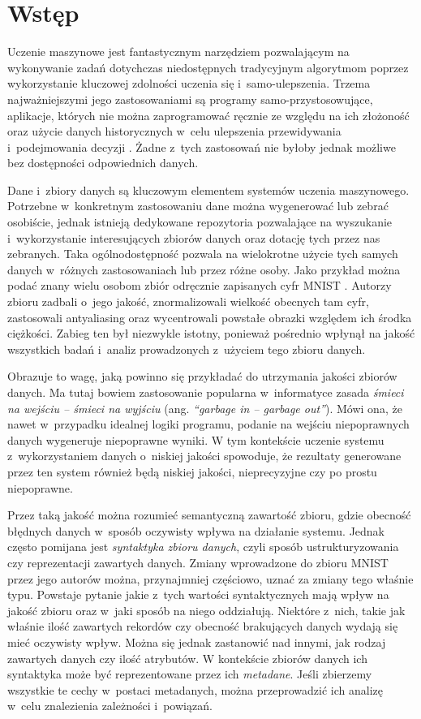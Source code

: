 \chapter*{Wstęp}
\label{ch:introduction}

Uczenie maszynowe jest fantastycznym narzędziem pozwalającym na wykonywanie zadań dotychczas niedostępnych tradycyjnym algorytmom poprzez wykorzystanie kluczowej zdolności uczenia się i~samo-ulepszenia.
Trzema najważniejszymi jego zastosowaniami są programy samo-przystosowujące, aplikacje, których nie można zaprogramować ręcznie ze względu na ich złożoność oraz użycie danych historycznych w~celu ulepszenia przewidywania i~podejmowania decyzji \cite{mitchell1997machine}.
Żadne z~tych zastosowań nie byłoby jednak możliwe bez dostępności odpowiednich danych.

Dane i~zbiory danych są kluczowym elementem systemów uczenia maszynowego.
Potrzebne w~konkretnym zastosowaniu dane można wygenerować lub zebrać osobiście, jednak istnieją dedykowane repozytoria pozwalające na wyszukanie i~wykorzystanie interesujących zbiorów danych oraz dotację tych przez nas zebranych.
Taka ogólnodostępność pozwala na wielokrotne użycie tych samych danych w~różnych zastosowaniach lub przez różne osoby.
Jako przykład można podać znany wielu osobom zbiór odręcznie zapisanych cyfr MNIST \cite{mnist}.
Autorzy zbioru zadbali o~jego jakość, znormalizowali wielkość obecnych tam cyfr, zastosowali antyaliasing oraz wycentrowali powstałe obrazki względem ich środka ciężkości.
Zabieg ten był niezwykle istotny, ponieważ pośrednio wpłynął na jakość wszystkich badań i~analiz prowadzonych z~użyciem tego zbioru danych.

Obrazuje to wagę, jaką powinno się przykładać do utrzymania jakości zbiorów danych.
Ma tutaj bowiem zastosowanie popularna w~informatyce zasada \textit{śmieci na wejściu -- śmieci na wyjściu} (ang. \textit{``garbage in -- garbage out''}).
Mówi ona, że nawet w~przypadku idealnej logiki programu, podanie na wejściu niepoprawnych danych wygeneruje niepoprawne wyniki.
W tym kontekście uczenie systemu z~wykorzystaniem danych o~niskiej jakości spowoduje, że rezultaty generowane przez ten system również będą niskiej jakości, nieprecyzyjne czy po prostu niepoprawne.

Przez taką jakość można rozumieć semantyczną zawartość zbioru, gdzie obecność błędnych danych w~sposób oczywisty wpływa na działanie systemu.
Jednak często pomijana jest \textit{syntaktyka zbioru danych}, czyli sposób ustrukturyzowania czy reprezentacji zawartych danych.
Zmiany wprowadzone do zbioru MNIST przez jego autorów można, przynajmniej częściowo, uznać za zmiany tego właśnie typu.
Powstaje pytanie jakie z~tych wartości syntaktycznych mają wpływ na jakość zbioru oraz w~jaki sposób na niego oddziałują.
Niektóre z~nich, takie jak właśnie ilość zawartych rekordów czy obecność brakujących danych wydają się mieć oczywisty wpływ.
Można się jednak zastanowić nad innymi, jak rodzaj zawartych danych czy ilość atrybutów.
W kontekście zbiorów danych ich syntaktyka może być reprezentowane przez ich \textit{metadane}.
Jeśli zbierzemy wszystkie te cechy w~postaci metadanych, można przeprowadzić ich analizę w~celu znalezienia zależności i~powiązań.

